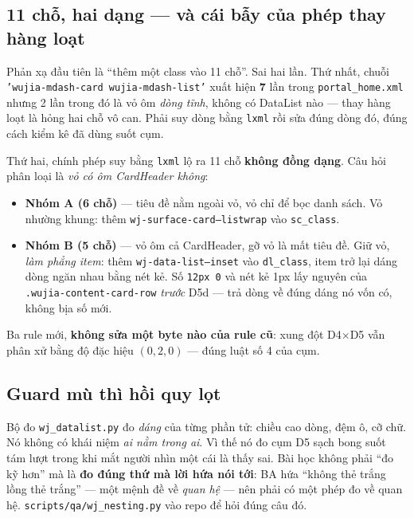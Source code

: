 \subsection*{11 chỗ, hai dạng --- và cái bẫy của phép thay hàng loạt}

Phản xạ đầu tiên là ``thêm một class vào 11 chỗ''. Sai hai lần. Thứ nhất, chuỗi
\texttt{'wujia-mdash-card wujia-mdash-list'} xuất hiện \textbf{7} lần trong
\texttt{portal\_home.xml} nhưng 2 lần trong đó là vỏ ôm \emph{dòng tĩnh}, không có DataList nào ---
thay hàng loạt là hỏng hai chỗ vô can. Phải suy dòng bằng \texttt{lxml} rồi sửa đúng dòng đó, đúng
cách kiểm kê đã dùng suốt cụm.

Thứ hai, chính phép suy bằng \texttt{lxml} lộ ra 11 chỗ \textbf{không đồng dạng}. Câu hỏi phân loại
là \emph{vỏ có ôm CardHeader không}:

\begin{itemize}
\item \textbf{Nhóm A (6 chỗ)} --- tiêu đề nằm ngoài vỏ, vỏ chỉ để bọc danh sách. Vỏ nhường khung:
  thêm \texttt{wj-surface-card--listwrap} vào \texttt{sc\_class}.
\item \textbf{Nhóm B (5 chỗ)} --- vỏ ôm cả CardHeader, gỡ vỏ là mất tiêu đề. Giữ vỏ, \emph{làm
  phẳng item}: thêm \texttt{wj-data-list--inset} vào \texttt{dl\_class}, item trở lại dáng dòng ngăn
  nhau bằng nét kẻ. Số \texttt{12px 0} và nét kẻ 1px lấy nguyên của
  \texttt{.wujia-content-card-row} \emph{trước} D5d --- trả dòng về đúng dáng nó vốn có, không bịa
  số mới.
\end{itemize}

Ba rule mới, \textbf{không sửa một byte nào của rule cũ}: xung đột D4$\times$D5 vẫn phân xử bằng độ
đặc hiệu $(0,2,0)$ --- đúng luật số 4 của cụm.

\subsection*{Guard mù thì hồi quy lọt}

Bộ đo \texttt{wj\_datalist.py} đo \emph{dáng} của từng phần tử: chiều cao dòng, đệm ô, cỡ chữ. Nó
không có khái niệm \emph{ai nằm trong ai}. Vì thế nó đo cụm D5 sạch bong suốt tám lượt trong khi
mắt người nhìn một cái là thấy sai. Bài học không phải ``đo kỹ hơn'' mà là \textbf{đo đúng thứ mà
lời hứa nói tới}: BA hứa ``không thẻ trắng lồng thẻ trắng'' --- một mệnh đề về \emph{quan hệ} ---
nên phải có một phép đo về quan hệ. \texttt{scripts/qa/wj\_nesting.py} vào repo để hỏi đúng câu đó.

